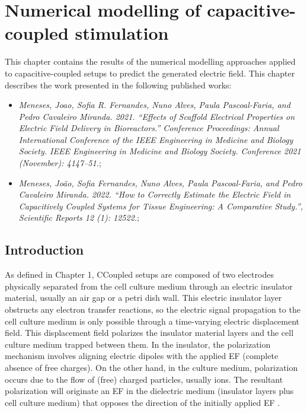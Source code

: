 %
%



\newpage
\chapter{Numerical modelling of capacitive-coupled stimulation}
This chapter contains the results of the numerical modelling approaches applied to capacitive-coupled setups to predict the generated electric field. This chapter describes the work presented in the following published works:
\begin{itemize}
\item \small \textit{Meneses, Joao, Sofia R. Fernandes, Nuno Alves, Paula Pascoal-Faria, and Pedro Cavaleiro Miranda. 2021. “Effects of Scaffold Electrical Properties on Electric Field Delivery in Bioreactors.” Conference Proceedings: Annual International Conference of the IEEE Engineering in Medicine and Biology Society. IEEE Engineering in Medicine and Biology Society. Conference 2021 (November): 4147–51.};
\item \small \textit{Meneses, João, Sofia Fernandes, Nuno Alves, Paula Pascoal-Faria, and Pedro Cavaleiro Miranda. 2022. “How to Correctly Estimate the Electric Field in Capacitively Coupled Systems for Tissue Engineering: A Comparative Study.”, Scientific Reports 12 (1): 12522.};
\end{itemize}


\newpage
\section{Introduction}

As defined in Chapter 1, \acs{CCoupled} setups are composed of two electrodes physically separated from the cell culture medium through an electric insulator material, usually an air gap or a petri dish wall. This electric insulator layer obstructs any electron transfer reactions, so the electric signal propagation to the cell culture medium is only possible through a time-varying electric displacement field. This displacement field polarizes the insulator material layers and the cell culture medium trapped between them. In the insulator, the polarization mechanism involves aligning electric dipoles with the applied \acs{EF} (complete absence of free charges). On the other hand, in the culture medium, polarization occurs due to the flow of (free) charged particles, usually ions. The resultant polarization will originate an \acs{EF} in the dielectric medium (insulator layers plus cell culture medium) that opposes the direction of the initially applied \acs{EF} \cite{Ida_undated-cu}. 

